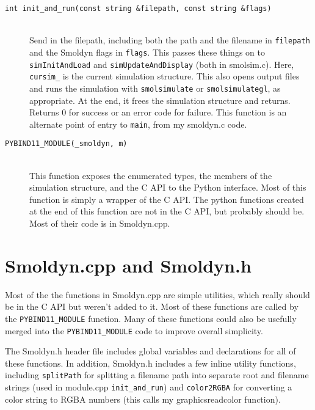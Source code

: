 \documentclass {book}
\newcommand {\ttt} {\texttt}
\begin{document}
\begin{description}

\item[\ttt{int init\_and\_run(const string \&filepath, const string \&flags)}]
\hfill \\
Send in the filepath, including both the path and the filename in \ttt{filepath} and the Smoldyn flags in \ttt{flags}. This passes these things on to \ttt{simInitAndLoad} and \ttt{simUpdateAndDisplay} (both in smolsim.c). Here, \ttt{cursim\_} is the current simulation structure. This also opens output files and runs the simulation with \ttt{smolsimulate} or \ttt{smolsimulategl}, as appropriate. At the end, it frees the simulation structure and returns. Returns 0 for success or an error code for failure. This function is an alternate point of entry to \ttt{main}, from my smoldyn.c code.

\item[\ttt{PYBIND11\_MODULE(\_smoldyn, m)}]
\hfill \\
This function exposes the enumerated types, the members of the simulation structure, and the C API to the Python interface. Most of this function is simply a wrapper of the C API. The python functions created at the end of this function are not in the C API, but probably should be. Most of their code is in Smoldyn.cpp.

\end{description}

\section{Smoldyn.cpp and Smoldyn.h}

Most of the the functions in Smoldyn.cpp are simple utilities, which really should be in the C API but weren't added to it. Most of these functions are called by the \ttt{PYBIND11\_MODULE} function. Many of these functions could also be usefully merged into the \ttt{PYBIND11\_MODULE} code to improve overall simplicity.

The Smoldyn.h header file includes global variables and declarations for all of these functions. In addition, Smoldyn.h includes a few inline utility functions, including \ttt{splitPath} for splitting a filename path into separate root and filename strings (used in module.cpp \ttt{init\_and\_run}) and \ttt{color2RGBA} for converting a color string to RGBA numbers (this calls my graphicsreadcolor function).
\end{document}
